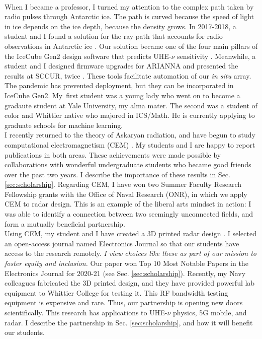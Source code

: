 \documentclass[../../main.tex]{subfiles}
\begin{document}
\\
\vspace{0.15cm}
When I became a professor, I turned my attention to the complex path taken by radio pulses through Antarctic ice.  The path is curved because the speed of light in ice depends on the ice depth, because the density grows.  In 2017-2018, a student and I found a solution for the ray-path that accounts for radio observations in Antarctic ice \cite{Barwick:2018497}.  Our solution became one of the four main pillars of the IceCube Gen2 design software that predicts UHE-$\nu$ sensitivity \cite{10.1140/epjc/s10052-020-7612-8} \cite{10.1140/epjc/s10052-019-6971-5}.  Meanwhile, a student and I designed firmware upgrades for ARIANNA and presented the results at SCCUR, twice \cite{sccur1} \cite{sccur2}.  These tools facilitate automation of our \textit{in situ} array.  The pandemic has prevented deployment, but they can be incorporated in IceCube Gen2.  My\ first student was a young lady who went on to become a gradaute student at Yale University, my alma mater.  The second was a student of color and Whittier native who majored in ICS/Math.  He is currently applying to graduate schools for machine learning.
\\
\vspace{0.15cm}
I recently returned to the theory of Askaryan radiation, and have begun to study computational electromagnetism (CEM) \cite{time} \cite{electronics10040415}.  My students and I are happy to report publications in both areas.  These achievements were made possible by collaborations with wonderful undergraduate students who became good friends over the past two years.  I describe the importance of these results in Sec. \ref{sec:scholarship}.  Regarding CEM, I have won two Summer Faculty Research Fellowship grants with the Office of Naval Research (ONR), in which we apply CEM to radar design.  This is an example of the liberal arts mindset in action: I was able to identify a connection between two seemingly unconnected fields, and form a mutually beneficial partnership.
\\
\vspace{0.15cm}
Using CEM, my student and I have created a 3D printed radar design \cite{electronics10040415}.  I selected an open-access journal named Electronics Journal so that our students have access to the research remotely.  \textit{I view choices like these as part of our mission to foster equity and inclusion.}  Our paper won Top 10 Most Notable Papers in the Electronics Journal for 2020-21 (see Sec. \ref{sec:scholarship}).  Recently, my Navy colleagues fabricated the 3D printed design, and they have provided powerful lab equipment to Whittier College for testing it.  This RF bandwidth testing equipment is expensive and rare.  Thus, our partnership is opening new doors scientifically.  This research has applications to UHE-$\nu$ physics, 5G mobile, and radar.  I describe the partnership in Sec. \ref{sec:scholarship}, and how it will benefit our students.
\end{document}
